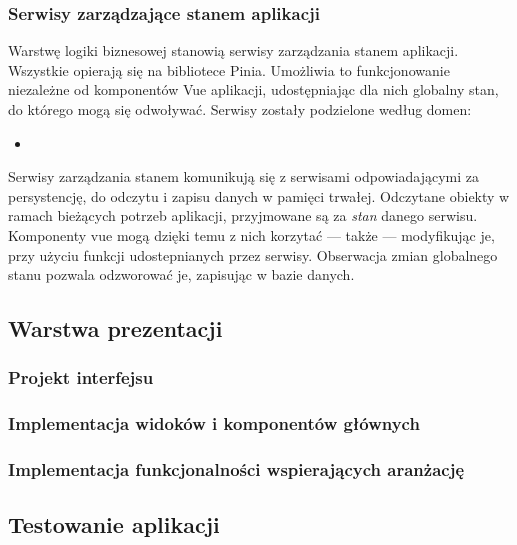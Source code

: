 \subsubsection{Serwisy zarządzające stanem aplikacji}
Warstwę logiki biznesowej stanowią serwisy zarządzania stanem aplikacji.
Wszystkie opierają się na bibliotece Pinia.
Umożliwia to funkcjonowanie niezależne od komponentów Vue aplikacji, udostępniając dla nich globalny stan,
do którego mogą się odwoływać. Serwisy zostały podzielone według domen:
\begin{itemize}
	\item
\end{itemize}
Serwisy zarządzania stanem komunikują się z serwisami odpowiadającymi za persystencję,
do odczytu i zapisu danych w pamięci trwałej. Odczytane obiekty w ramach bieżących potrzeb aplikacji, przyjmowane są
za \textit{stan} danego serwisu. Komponenty vue mogą dzięki temu z nich korzytać — także — modyfikując je, przy użyciu
funkcji udostepnianych przez serwisy. Obserwacja zmian globalnego stanu pozwala odzworować je, zapisując w bazie danych.



\subsection{Warstwa prezentacji}
\subsubsection{Projekt interfejsu}
\subsubsection{Implementacja widoków i komponentów głównych}
\subsubsection{Implementacja funkcjonalności wspierających aranżację}
\subsection{Testowanie aplikacji}

